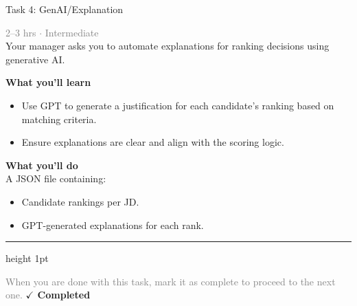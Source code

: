 \documentclass[10pt,a4paper]{article}
\begin{document}
\begin{taskbox}{Task 4: GenAI/Explanation}

    {\small \textcolor{gray}{2--3 hrs $\cdot$ Intermediate}}\\[12pt]

     Your manager asks you to automate explanations for ranking decisions using generative AI.  


\vspace{8pt}
{\large \textbf{\textcolor{brandLight}{What you'll learn}}}\\[4pt]  
\begin{itemize}
    \item Use GPT to generate a justification for each candidate’s ranking based on matching criteria.  
    \item Ensure explanations are clear and align with the scoring logic.  
\end{itemize}

\vspace{8pt}
{\large \textbf{\textcolor{brandLight}{What you'll do}}}\\[4pt]  
A JSON file containing:  
\begin{itemize}
    \item Candidate rankings per JD.  
    \item GPT-generated explanations for each rank.\par
\end{itemize}

    \vspace{16pt}

    \textcolor{cardBorder}{\hrule height 1pt}\vspace{8pt}

    \small \textcolor{gray}{When you are done with this task, mark it as complete to proceed to the next one.} \hfill \textbf{\textcolor{brandDark}{$\checkmark$ Completed}}

\end{taskbox}
\end{document}
